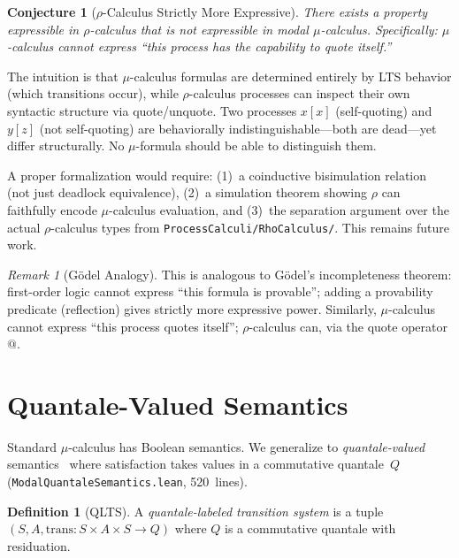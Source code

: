 \documentclass[11pt]{article}
\newtheorem{conjecture}[theorem]{Conjecture}
\theoremstyle{definition}
\newtheorem{definition}[theorem]{Definition}
\theoremstyle{remark}
\newtheorem{remark}[theorem]{Remark}
\begin{document}
\begin{conjecture}[$\rho$-Calculus Strictly More Expressive]
\label{conj:rho-mu-expressiveness}
There exists a property expressible in $\rho$-calculus that is not
expressible in modal $\mu$-calculus.  Specifically: $\mu$-calculus
cannot express ``this process has the capability to quote itself.''
\end{conjecture}

The intuition is that $\mu$-calculus formulas are determined entirely by
LTS behavior (which transitions occur), while $\rho$-calculus processes
can inspect their own syntactic structure via quote/unquote.  Two
processes $x[x]$ (self-quoting) and $y[z]$ (not self-quoting) are
behaviorally indistinguishable---both are dead---yet differ structurally.
No $\mu$-formula should be able to distinguish them.

A proper formalization would require: (1)~a coinductive bisimulation
relation (not just deadlock equivalence), (2)~a simulation theorem
showing $\rho$ can faithfully encode $\mu$-calculus evaluation, and
(3)~the separation argument over the actual $\rho$-calculus types from
\texttt{ProcessCalculi/RhoCalculus/}.  This remains future work.

\begin{remark}[G\"odel Analogy]
This is analogous to G\"odel's incompleteness theorem: first-order logic
cannot express ``this formula is provable''; adding a provability
predicate (reflection) gives strictly more expressive power.  Similarly,
$\mu$-calculus cannot express ``this process quotes itself'';
$\rho$-calculus can, via the quote operator $\mathsf{@}$.
\end{remark}


\section{Quantale-Valued Semantics}
\label{sec:quantale}

Standard $\mu$-calculus has Boolean semantics.  We generalize to
\emph{quantale-valued} semantics~\cite{Kozen1983} where satisfaction
takes values in a commutative quantale~$Q$
(\texttt{ModalQuantaleSemantics.lean}, 520~lines).

\begin{definition}[QLTS]
A \emph{quantale-labeled transition system} is a tuple
$(S, A, \mathrm{trans} : S \times A \times S \to Q)$ where $Q$ is a
commutative quantale with residuation.
\end{definition}
\end{document}
